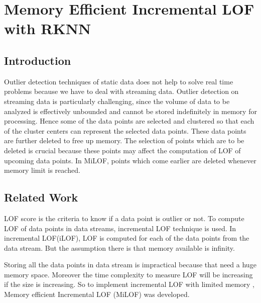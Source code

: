 \chapter{Memory Efficient Incremental LOF with RKNN}\label{Memory Efficient Incremental LOF with RKNN}

\section{Introduction}


Outlier detection techniques of static data does not help to solve real time problems because we have to deal with streaming data. Outlier detection on streaming data is particularly
challenging, since the volume of data to be analyzed is
effectively unbounded and cannot be stored indefinitely in
memory for processing. Hence some of the data points are selected and clustered so that each of the cluster centers can represent the selected data points. These data points are further deleted to free up memory. The selection of points which are to be deleted is crucial because these points may affect the computation of LOF of upcoming data points. In MiLOF, points which come earlier are deleted whenever memory limit is reached.  


\section{Related Work}


LOF score is the criteria to know if a data point is outlier or not. To compute LOF of data points in data streams, incremental LOF technique is used. In incremental LOF(iLOF), LOF is computed for each of the data points from the data stream. But the assumption there is that memory available is infinity. 

\par
Storing all the data points in data stream is impractical because that need a huge memory space. Moreover the time complexity to measure LOF will be increasing if the size is increasing. So to implement incremental LOF with limited memory , Memory efficient Incremental LOF (MiLOF) was developed. 

